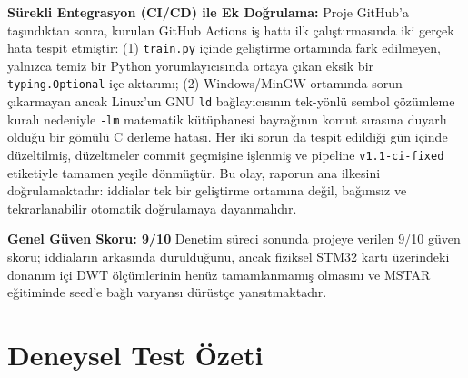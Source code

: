 \documentclass[11pt,a4paper]{article}
\begin{document}
\textbf{Sürekli Entegrasyon (CI/CD) ile Ek Doğrulama:} Proje GitHub'a taşındıktan sonra, kurulan
GitHub Actions iş hattı ilk çalıştırmasında iki gerçek hata tespit etmiştir: (1) \texttt{train.py}
içinde geliştirme ortamında fark edilmeyen, yalnızca temiz bir Python yorumlayıcısında ortaya çıkan
eksik bir \texttt{typing.Optional} içe aktarımı; (2) Windows/MinGW ortamında sorun çıkarmayan ancak
Linux'un GNU \texttt{ld} bağlayıcısının tek-yönlü sembol çözümleme kuralı nedeniyle \texttt{-lm}
matematik kütüphanesi bayrağının komut sırasına duyarlı olduğu bir gömülü C derleme hatası. Her iki
sorun da tespit edildiği gün içinde düzeltilmiş, düzeltmeler commit geçmişine işlenmiş ve pipeline
\texttt{v1.1-ci-fixed} etiketiyle tamamen yeşile dönmüştür. Bu olay, raporun ana ilkesini
doğrulamaktadır: iddialar tek bir geliştirme ortamına değil, bağımsız ve tekrarlanabilir otomatik
doğrulamaya dayanmalıdır.

\textbf{Genel Güven Skoru: 9/10}  
Denetim süreci sonunda projeye verilen 9/10 güven skoru; iddiaların arkasında durulduğunu, ancak fiziksel STM32 kartı üzerindeki donanım içi DWT ölçümlerinin henüz tamamlanmamış olmasını ve MSTAR eğitiminde seed'e bağlı varyansı dürüstçe yansıtmaktadır.

\clearpage
\section{Deneysel Test Özeti}
\end{document}
